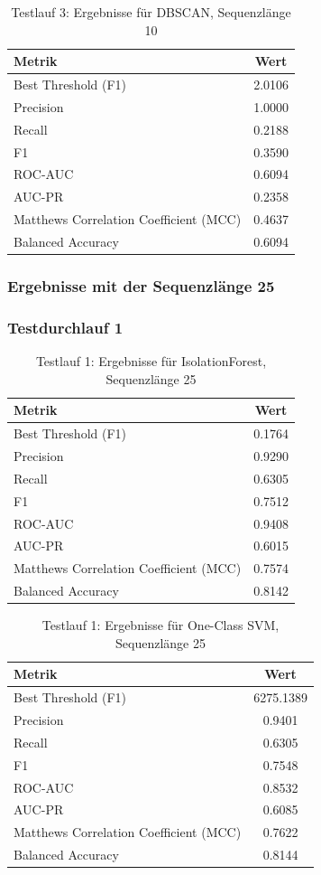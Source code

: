 \documentclass[a4paper,12pt]{article}
\begin{document}
\begin{table}[H]
	\centering
	\begin{tabular}{l c}
		\hline
		Metrik & Wert \\
		\hline
		Best Threshold (F1) & 2.0106 \\
		Precision & 1.0000 \\
		Recall & 0.2188 \\
		F1 & 0.3590 \\
		ROC-AUC & 0.6094 \\
		AUC-PR & 0.2358 \\
		Matthews Correlation Coefficient (MCC) & 0.4637 \\
		Balanced Accuracy & 0.6094 \\
		\hline
	\end{tabular}
	\caption{Testlauf 3: Ergebnisse für DBSCAN, Sequenzlänge 10}
\end{table}


\subsubsection{Ergebnisse mit der Sequenzlänge 25}
\subsubsection{Testdurchlauf 1}
\begin{table}[H]
	\centering
	\begin{tabular}{l c}
		\hline
		Metrik & Wert \\
		\hline
		Best Threshold (F1) & 0.1764 \\
		Precision & 0.9290 \\
		Recall & 0.6305 \\
		F1 & 0.7512 \\
		ROC-AUC & 0.9408 \\
		AUC-PR & 0.6015 \\
		Matthews Correlation Coefficient (MCC) & 0.7574 \\
		Balanced Accuracy & 0.8142 \\
		\hline
	\end{tabular}
	\caption{Testlauf 1: Ergebnisse für IsolationForest, Sequenzlänge 25}
\end{table}

\begin{table}[H]
	\centering
	\begin{tabular}{l c}
		\hline
		Metrik & Wert \\
		\hline
		Best Threshold (F1) & 6275.1389 \\
		Precision & 0.9401 \\
		Recall & 0.6305 \\
		F1 & 0.7548 \\
		ROC-AUC & 0.8532 \\
		AUC-PR & 0.6085 \\
		Matthews Correlation Coefficient (MCC) & 0.7622 \\
		Balanced Accuracy & 0.8144 \\
		\hline
	\end{tabular}
	\caption{Testlauf 1: Ergebnisse für One-Class SVM, Sequenzlänge 25}
\end{table}
\end{document}
